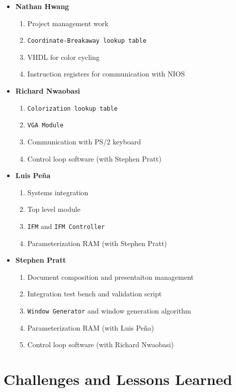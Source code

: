 \documentclass{article}
\begin{document}
\begin{itemize}

\item
\textbf{Nathan Hwang}
\begin{enumerate}
\item Project management work
\item \texttt{Coordinate-Breakaway lookup table}
\item VHDL for color cycling
\item Instruction registers for communication with NIOS
\end{enumerate}

\item 
\textbf{Richard Nwaobasi}
\begin{enumerate}
\item \texttt{Colorization lookup table}
\item \texttt{VGA Module}
\item Communication with PS/2 keyboard
\item Control loop software (with Stephen Pratt)
\end{enumerate}

\item 
\textbf{Luis Pe\~{n}a}
\begin{enumerate}
\item Systems integration
\item Top level module
\item \texttt{IFM} and \texttt{IFM Controller}
\item Parameterization RAM (with Stephen Pratt)
\end{enumerate}

\item 
\textbf{Stephen Pratt}
\begin{enumerate}
\item Document composition and presentaiton management
\item Integration test bench and validation script
\item \texttt{Window Generator} and window generation algorithm
\item Parameterization RAM (with Luis Pe\~{n}a)
\item Control loop software (with Richard Nwaobasi)
\end{enumerate}

\end{itemize}


\section{Challenges and Lessons Learned}
\end{document}
